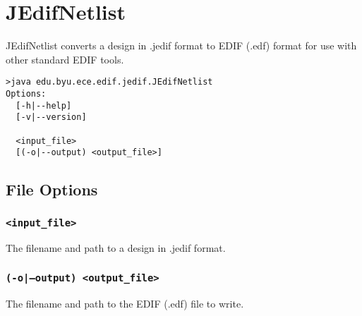 \section{JEdifNetlist}
JEdifNetlist converts a design in .jedif format to EDIF (.edf) format for use
with other standard EDIF tools.

\begin{verbatim}
>java edu.byu.ece.edif.jedif.JEdifNetlist
Options:
  [-h|--help]
  [-v|--version]

  <input_file>
  [(-o|--output) <output_file>]
\end{verbatim}

\subsection{File Options}

\subsubsection{\texttt{<input\_file>}}
The filename and path to a design in .jedif format.

\subsubsection{\texttt{(-o|--output) <output\_file>}}
The filename and path to the EDIF (.edf) file to write.
